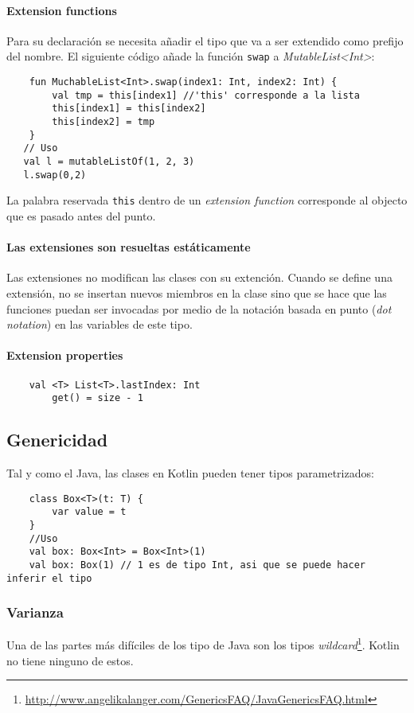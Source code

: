 \paragraph{Extension functions} Para su declaración se necesita añadir el tipo que va a ser extendido como prefijo del nombre. El siguiente código añade la función \texttt{swap} a \emph{MutableList<Int>}:
\begin{verbatim}
    fun MuchableList<Int>.swap(index1: Int, index2: Int) {
        val tmp = this[index1] //'this' corresponde a la lista
        this[index1] = this[index2]
        this[index2] = tmp
    }
   // Uso
   val l = mutableListOf(1, 2, 3)
   l.swap(0,2) 
\end{verbatim}
La palabra reservada \texttt{this} dentro de un \emph{extension function} corresponde al objecto que es pasado antes del punto.

\paragraph{Las extensiones son resueltas estáticamente} Las extensiones no modifican las clases con su extención. Cuando se define una extensión, no se insertan nuevos miembros en la clase sino que se hace que las funciones puedan ser invocadas por medio de la notación basada en punto (\emph{dot notation}) en las variables de este tipo.

\paragraph{Extension properties} 
\begin{verbatim}
    val <T> List<T>.lastIndex: Int
        get() = size - 1
\end{verbatim}


\subsection{Genericidad}
Tal y como el Java, las clases en Kotlin pueden tener tipos parametrizados:
\begin{verbatim}
    class Box<T>(t: T) {
        var value = t
    }
    //Uso
    val box: Box<Int> = Box<Int>(1)
    val box: Box(1) // 1 es de tipo Int, asi que se puede hacer inferir el tipo
\end{verbatim}

\subsubsection{Varianza}
Una de las partes más difíciles de los tipo de Java son los tipos \emph{wildcard}\footnote{\url{http://www.angelikalanger.com/GenericsFAQ/JavaGenericsFAQ.html}}. Kotlin no tiene ninguno de estos.

